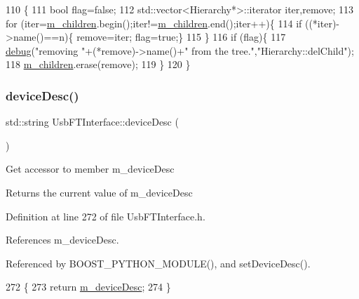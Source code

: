 \begin{DoxyCode}
110                                    \{
111   \textcolor{keywordtype}{bool} flag=\textcolor{keyword}{false};
112   std::vector<Hierarchy*>::iterator iter,\textcolor{keyword}{remove};
113   \textcolor{keywordflow}{for} (iter=\hyperlink{classHierarchy_a038816763941fd4a930504917f60483b}{m\_children}.begin();iter!=\hyperlink{classHierarchy_a038816763941fd4a930504917f60483b}{m\_children}.end();iter++)\{
114     \textcolor{keywordflow}{if} ((*iter)->name()==n)\{ \textcolor{keyword}{remove}=iter; flag=\textcolor{keyword}{true};\}
115   \}
116   \textcolor{keywordflow}{if} (flag)\{
117     \hyperlink{classObject_aac010553f022165573714b7014a15f0d}{debug}(\textcolor{stringliteral}{"removing "}+(*remove)->name()+\textcolor{stringliteral}{" from the tree."},\textcolor{stringliteral}{"Hierarchy::delChild"});
118     \hyperlink{classHierarchy_a038816763941fd4a930504917f60483b}{m\_children}.erase(\textcolor{keyword}{remove});
119   \}
120 \}
\end{DoxyCode}
\mbox{\label{classUsbFTInterface_af353796fd68a869ea5c8e753aa65dc2c}} 
\subsubsection{\texorpdfstring{device\+Desc()}{deviceDesc()}}
{\footnotesize\ttfamily std\+::string Usb\+F\+T\+Interface\+::device\+Desc (\begin{DoxyParamCaption}{ }\end{DoxyParamCaption})\hspace{0.3cm}{\ttfamily [inline]}}

Get accessor to member m\+\_\+device\+Desc \begin{DoxyReturn}{Returns}
the current value of m\+\_\+device\+Desc 
\end{DoxyReturn}


Definition at line 272 of file Usb\+F\+T\+Interface.\+h.



References m\+\_\+device\+Desc.



Referenced by B\+O\+O\+S\+T\+\_\+\+P\+Y\+T\+H\+O\+N\+\_\+\+M\+O\+D\+U\+L\+E(), and set\+Device\+Desc().


\begin{DoxyCode}
272                           \{
273     \textcolor{keywordflow}{return} \hyperlink{classUsbFTInterface_a500067688c32cdb3719fecf128e88dca}{m\_deviceDesc};
274   \}
\end{DoxyCode}
\mbox{\label{classObject_a2e3947f2870094c332d7454117f3ec63}} 
